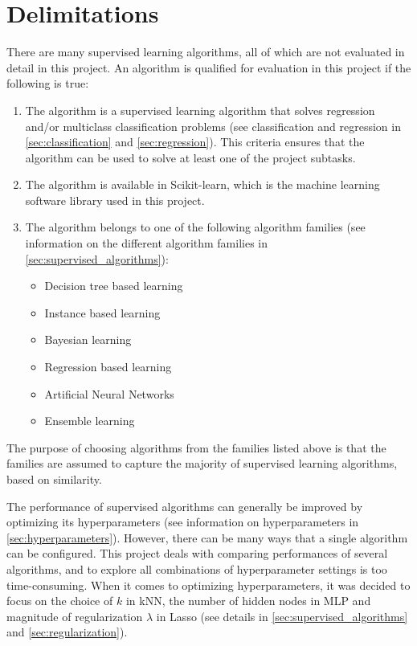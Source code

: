 \section{Delimitations} \label{sec:delimitations}
	There are many supervised learning algorithms, all of which are not evaluated in detail in this project. %
An algorithm is qualified for evaluation in this project if the following is true:
	\begin{enumerate}
		\item The algorithm is a supervised learning algorithm that solves regression and/or multiclass classification problems (see classification and regression in \ref{sec:classification} and \ref{sec:regression}). This criteria ensures that the algorithm can be used to solve at least one of the project subtasks.
		\item The algorithm is available in Scikit-learn, which is the machine learning software library used in this project. %
		\item The algorithm belongs to one of the following algorithm families (see information on the different algorithm families in \ref{sec:supervised_algorithms}):
			\begin{itemize}
				\item Decision tree based learning %
				\item Instance based learning %
				\item Bayesian learning %
				\item Regression based learning %
				\item Artificial Neural Networks %
				\item Ensemble learning %
			\end{itemize}
	\end{enumerate}
	The purpose of choosing algorithms from the families listed above is that the families are assumed to capture the majority of supervised learning algorithms, based on similarity.

	The performance of supervised algorithms can generally be improved by optimizing its hyperparameters (see information on hyperparameters in \ref{sec:hyperparameters}). However, there can be many ways that a single algorithm can be configured. This project deals with comparing performances of several algorithms, and to explore all combinations of hyperparameter settings is too time-consuming. When it comes to optimizing hyperparameters, it was decided to focus on the choice of $k$ in kNN, the number of hidden nodes in MLP and magnitude of regularization $\lambda$ in Lasso (see details in \ref{sec:supervised_algorithms} and \ref{sec:regularization}).
 
